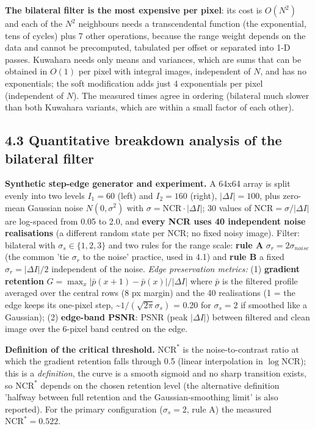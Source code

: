 \documentclass[10pt,a4paper]{article}
\begin{document}
\textbf{The bilateral filter is the most expensive per pixel}: its cost is $O(N^2)$ and each of the $N^2$ neighbours needs a transcendental function (the exponential, tens of cycles) plus 7 other operations, because the range weight depends on the data and cannot be precomputed, tabulated per offset or separated into 1-D passes. Kuwahara needs only means and variances, which are sums that can be obtained in $O(1)$ per pixel with integral images, independent of $N$, and has no exponentials; the soft modification adds just 4 exponentials per pixel (independent of $N$). The measured times agree in ordering (bilateral much slower than both Kuwahara variants, which are within a small factor of each other).

\subsection{4.3 Quantitative breakdown analysis of the bilateral filter}
\textbf{Synthetic step-edge generator and experiment.} A 64x64 array is split evenly into two levels $I_1=60$ (left) and $I_2=160$ (right), $|\Delta I|=100$, plus zero-mean Gaussian noise $N(0,\sigma^2)$ with $\sigma=\mathrm{NCR}\cdot|\Delta I|$; 30 values of $\mathrm{NCR}=\sigma/|\Delta I|$ are log-spaced from 0.05 to 2.0, and \textbf{every NCR uses 40 independent noise realisations} (a different random state per NCR; no fixed noisy image). Filter: bilateral with $\sigma_s\in\{1,2,3\}$ and two rules for the range scale: \textbf{rule A} $\sigma_r=2\sigma_{noise}$ (the common 'tie $\sigma_r$ to the noise' practice, used in 4.1) and \textbf{rule B} a fixed $\sigma_r=|\Delta I|/2$ independent of the noise. \textit{Edge preservation metrics:} (1) \textbf{gradient retention} $G=\max_x|\bar p(x+1)-\bar p(x)|/|\Delta I|$ where $\bar p$ is the filtered profile averaged over the central rows (8 px margin) and the 40 realisations (1 = the edge keeps its one-pixel step, \textasciitilde{}$1/(\sqrt{2\pi}\sigma_s)$ = 0.20 for $\sigma_s=2$ if smoothed like a Gaussian); (2) \textbf{edge-band PSNR}: PSNR (peak $|\Delta I|$) between filtered and clean image over the 6-pixel band centred on the edge.

\textbf{Definition of the critical threshold.} $\mathrm{NCR}^*$ is the noise-to-contrast ratio at which the gradient retention falls through 0.5 (linear interpolation in $\log\mathrm{NCR}$); this is a \textit{definition}, the curve is a smooth sigmoid and no sharp transition exists, so $\mathrm{NCR}^*$ depends on the chosen retention level (the alternative definition 'halfway between full retention and the Gaussian-smoothing limit' is also reported). For the primary configuration ($\sigma_s=2$, rule A) the measured $\mathrm{NCR}^*=0.522$.
\end{document}
